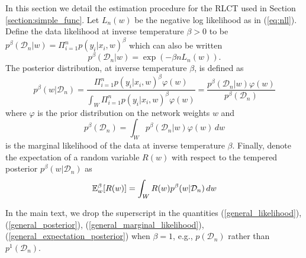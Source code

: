 \documentclass{article} %
\begin{document}
In this section we detail the estimation procedure for the RLCT used in Section \ref{section:simple_func}. Let $L_n(w)$ be the negative log likelihood as in (\ref{eq:nll}). Define the data likelihood at inverse temperature $\beta >0$ to be $p^\beta(\mathcal D_n | w) = \Pi_{i=1}^n p(y_i |x_i, w)^\beta$ which can also be written 
\begin{equation}
p^\beta(\mathcal D_n | w) = \exp(-\beta n L_n(w)).
\label{general_likelihood}
\end{equation}
The posterior distribution, at inverse temperature $\beta$, is defined as 
\begin{equation}
p^\beta(w|\mathcal D_n) = \frac{\Pi_{i=1}^n p(y_i|x_i,w)^\beta \varphi(w)}{\int_W \Pi_{i=1}^n p(y_i|x_i,w)^\beta \varphi(w)} = \frac{p^\beta(\mathcal D_n|w) \varphi(w)}{p^\beta(\mathcal D_n)}
\label{general_posterior}
\end{equation}
where $\varphi$ is the prior distribution on the network weights $w$ and
\begin{equation}
p^\beta(\mathcal D_n) = \int_W p^\beta(\mathcal D_n|w) \varphi(w) \,dw
\label{general_marginal_likelihood}
\end{equation}
is the marginal likelihood of the data at inverse temperature $\beta$. 
Finally, denote the expectation of a random variable $R(w)$ with respect to the tempered posterior $p^\beta(w|\mathcal D_n)$ as
\begin{equation}
{\mathbb{E}}_w^\beta [R(w)] = \int_W R(w) p^\beta(w|\mathcal D_n) \,dw
\label{general_expectation_posterior}
\end{equation}

In the main text, we drop the superscript in the quantities (\ref{general_likelihood}), (\ref{general_posterior}), (\ref{general_marginal_likelihood}), (\ref{general_expectation_posterior}) when $\beta = 1$, e.g., $p(\mathcal D_n)$ rather than $p^1(\mathcal D_n)$.
\end{document}
